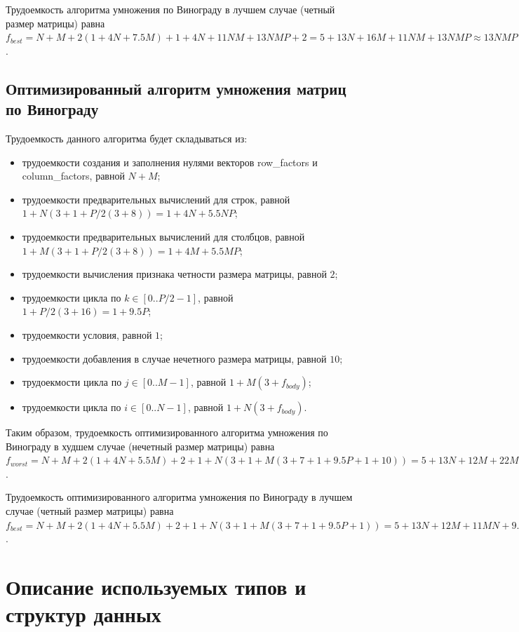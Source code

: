 Трудоемкость алгоритма умножения по Винограду в лучшем случае (четный размер матрицы) равна $f_{best} = N + M + 2(1 + 4N + 7.5M) + 1 + 4N + 11NM + 13NMP + 2 = 5 + 13N + 16M + 11NM + 13NMP \approx 13NMP$.

\subsection{Оптимизированный алгоритм умножения матриц по Винограду}

Трудоемкость данного алгоритма будет складываться из:

\begin{itemize}
	\item трудоемкости создания и заполнения нулями векторов row\_factors и column\_factors, равной $N + M$;
	\item трудоемкости предварительных вычислений для строк, равной $1 + N(3 + 1 + P/2(3 + 8)) = 1 + 4N + 5.5NP$;
	\item трудоемкости предварительных вычислений для столбцов, равной $1 + M(3 + 1 + P/2(3 + 8)) = 1 + 4M + 5.5MP$;
	\item трудоемкости вычисления признака четности размера матрицы, равной $2$;
	\item трудоемкости цикла по $k \in [0..P/2-1]$, равной $1 + P/2(3 + 16) = 1 + 9.5P$;
	\item трудоемкости условия, равной $1$;
	\item трудоемкости добавления в случае нечетного размера матрицы, равной $10$;
	\item трудоекмости цикла по $j \in [0..M-1]$, равной $1 + M(3 + f_{body})$;
	\item трудоемкости цикла по $i \in [0..N-1]$, равной $1 + N(3 + f_{body})$.
\end{itemize}

Таким образом, трудоемкость оптимизированного алгоритма умножения по Винограду в худшем случае (нечетный размер матрицы) равна $f_{worst} = N + M + 2(1 + 4N + 5.5M) + 2 + 1 + N(3 + 1 + M(3 + 7 + 1 + 9.5P + 1 + 10)) = 5 + 13N + 12M + 22MN + 9.5MNP \approx 9.5NMP$.

Трудоемкость оптимизированного алгоритма умножения по Винограду в лучшем случае (четный размер матрицы) равна $f_{best} = N + M + 2(1 + 4N + 5.5M) + 2 + 1 + N(3 + 1 + M(3 + 7 + 1 + 9.5P + 1)) = 5 + 13N + 12M + 11MN + 9.5MNP \approx 9.5NMP$.


\section{Описание используемых типов и структур данных}

